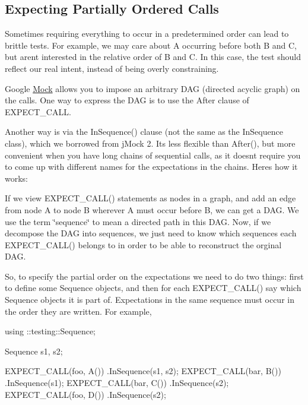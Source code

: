 \subsection*{Expecting Partially Ordered Calls}

Sometimes requiring everything to occur in a predetermined order can lead to brittle tests. For example, we may care about {\ttfamily A} occurring before both {\ttfamily B} and {\ttfamily C}, but aren\textquotesingle{}t interested in the relative order of {\ttfamily B} and {\ttfamily C}. In this case, the test should reflect our real intent, instead of being overly constraining.

Google \hyperlink{class_mock}{Mock} allows you to impose an arbitrary D\+AG (directed acyclic graph) on the calls. One way to express the D\+AG is to use the After clause of {\ttfamily E\+X\+P\+E\+C\+T\+\_\+\+C\+A\+LL}.

Another way is via the {\ttfamily In\+Sequence()} clause (not the same as the {\ttfamily In\+Sequence} class), which we borrowed from j\+Mock 2. It\textquotesingle{}s less flexible than {\ttfamily After()}, but more convenient when you have long chains of sequential calls, as it doesn\textquotesingle{}t require you to come up with different names for the expectations in the chains. Here\textquotesingle{}s how it works\+:

If we view {\ttfamily E\+X\+P\+E\+C\+T\+\_\+\+C\+A\+L\+L()} statements as nodes in a graph, and add an edge from node A to node B wherever A must occur before B, we can get a D\+AG. We use the term \char`\"{}sequence\char`\"{} to mean a directed path in this D\+AG. Now, if we decompose the D\+AG into sequences, we just need to know which sequences each {\ttfamily E\+X\+P\+E\+C\+T\+\_\+\+C\+A\+L\+L()} belongs to in order to be able to reconstruct the orginal D\+AG.

So, to specify the partial order on the expectations we need to do two things\+: first to define some {\ttfamily Sequence} objects, and then for each {\ttfamily E\+X\+P\+E\+C\+T\+\_\+\+C\+A\+L\+L()} say which {\ttfamily Sequence} objects it is part of. Expectations in the same sequence must occur in the order they are written. For example,


\begin{DoxyCode}
using ::testing::Sequence;

Sequence s1, s2;

EXPECT\_CALL(foo, A())
    .InSequence(s1, s2);
EXPECT\_CALL(bar, B())
    .InSequence(s1);
EXPECT\_CALL(bar, C())
    .InSequence(s2);
EXPECT\_CALL(foo, D())
    .InSequence(s2);
\end{DoxyCode}


